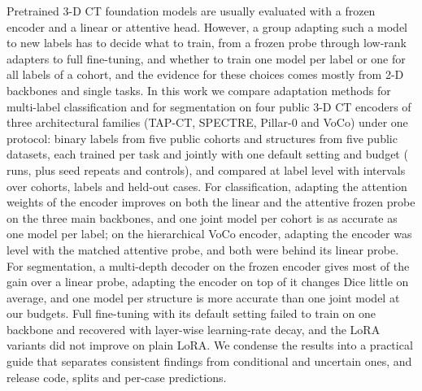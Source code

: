 Pretrained 3-D CT foundation models are usually evaluated with a frozen encoder and a linear or attentive head. However, a group adapting such a model to new labels has to decide what to train, from a frozen probe through low-rank adapters to full fine-tuning, and whether to train one model per label or one for all labels of a cohort, and the evidence for these choices comes mostly from 2-D backbones and single tasks. In this work we compare \numClsMethodsN{} adaptation methods for multi-label classification and \numSegMethodsN{} for segmentation on four public 3-D CT encoders of three architectural families (TAP-CT, SPECTRE, Pillar-0 and VoCo) under one protocol: \numLabelsN{} binary labels from five public cohorts and \numStructuresN{} structures from five public datasets, each trained per task and jointly with one default setting and budget (\numRunsMainN{} runs, plus seed repeats and controls), and compared at label level with intervals over cohorts, labels and held-out cases. For classification, adapting the attention weights of the encoder improves on both the linear and the attentive frozen probe on the three main backbones, and one joint model per cohort is as accurate as one model per label; on the hierarchical VoCo encoder, adapting the encoder was level with the matched attentive probe, and both were behind its linear probe. For segmentation, a multi-depth decoder on the frozen encoder gives most of the gain over a linear probe, adapting the encoder on top of it changes Dice little on average, and one model per structure is more accurate than one joint model at our budgets. Full fine-tuning with its default setting failed to train on one backbone and recovered with layer-wise learning-rate decay, and the LoRA variants did not improve on plain LoRA. We condense the results into a practical guide that separates consistent findings from conditional and uncertain ones, and release code, splits and per-case predictions.
